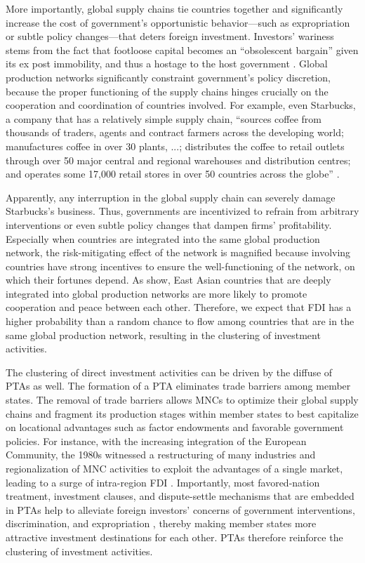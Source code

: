 \documentclass{article}
\begin{document}
More importantly, global supply chains tie countries together and significantly increase the cost of government's opportunistic behavior---such as expropriation or subtle policy changes---that deters foreign investment. Investors' wariness stems from the fact that footloose capital becomes an ``obsolescent bargain'' given its ex post immobility, and thus a hostage to the host government \citep{Vernon:1971,Vernon:1980}. Global production networks significantly constraint government's policy discretion, because the proper functioning of the supply chains hinges crucially on the cooperation and coordination of countries involved. For example, even Starbucks, a company that has a relatively simple supply chain, ``sources coffee from thousands of traders, agents and contract farmers across the developing world; manufactures coffee in over 30 plants, ...; distributes the coffee to retail outlets through over 50 major central and regional warehouses and distribution centres; and operates some 17,000 retail stores in over 50 countries across the globe'' \citep[142]{UNCTAD:2013}. 

Apparently, any interruption in the global supply chain can severely damage Starbucks's business. Thus, governments are incentivized to refrain from arbitrary interventions or even subtle policy changes that dampen firms' profitability. Especially when countries are integrated into the same global production network, the risk-mitigating effect of the network is magnified because involving countries have strong incentives to ensure the well-functioning of the network, on which their fortunes depend. As \citet{Kim_Solingen:2017} show, East Asian countries that are deeply integrated into global production networks are more likely to promote cooperation and peace between each other. Therefore, we expect that FDI has a higher probability than a random chance to flow among countries that are in the same global production network, resulting in the clustering of investment activities.

The clustering of direct investment activities can be driven by the diffuse of PTAs as well. The formation of a PTA eliminates trade barriers among member states. The removal of trade barriers allows MNCs to optimize their global supply chains and fragment its production stages within member states to best capitalize on locational advantages such as factor endowments and favorable government policies. For instance, with the increasing integration of the European Community, the 1980s witnessed a restructuring of many industries and regionalization of MNC activities to exploit the advantages of a single market, leading to a surge of intra-region FDI \citep[34]{UNCTAD:1991}. Importantly, most favored-nation treatment, investment clauses, and dispute-settle mechanisms that are embedded in PTAs help to alleviate foreign investors' concerns of government interventions, discrimination, and expropriation \citep{Buthe_Milner:2008,buthe2014foreign}, thereby making member states more attractive investment destinations for each other. PTAs therefore reinforce the clustering of investment activities.
\end{document}
